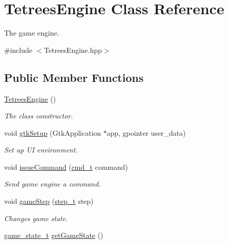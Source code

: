 \hypertarget{classTetreesEngine}{}\section{Tetrees\+Engine Class Reference}
\label{classTetreesEngine}


The game engine.  




{\ttfamily \#include $<$Tetrees\+Engine.\+hpp$>$}

\subsection*{Public Member Functions}
\begin{DoxyCompactItemize}
\item 
\mbox{\label{classTetreesEngine_ada1775237223604c895a50625eda1d49}} 
\hyperlink{classTetreesEngine_ada1775237223604c895a50625eda1d49}{Tetrees\+Engine} ()
\begin{DoxyCompactList}\small\item\em The class constructor. \end{DoxyCompactList}\item 
void \hyperlink{classTetreesEngine_a85e0da200fb3e17745f1978d24acca2f}{gtk\+Setup} (Gtk\+Application $\ast$app, gpointer user\+\_\+data)
\begin{DoxyCompactList}\small\item\em Set up UI environment. \end{DoxyCompactList}\item 
void \hyperlink{classTetreesEngine_aa2a283d09b0b6ab7c03ea2265a2e3438}{issue\+Command} (\hyperlink{TetreesDefs_8hpp_aadc337e2620d6621659e63e87c45e79d}{cmd\+\_\+t} command)
\begin{DoxyCompactList}\small\item\em Send game engine a command. \end{DoxyCompactList}\item 
void \hyperlink{classTetreesEngine_a33e9983a618b3538640b6bd987304b8b}{game\+Step} (\hyperlink{TetreesDefs_8hpp_a4d5a793092a473f85b4c1f7faf62afed}{step\+\_\+t} step)
\begin{DoxyCompactList}\small\item\em Changes game state. \end{DoxyCompactList}\item 
\hyperlink{TetreesDefs_8hpp_aebae08b2e3a36f1452b33acaf1eaab40}{game\+\_\+state\+\_\+t} \hyperlink{classTetreesEngine_a36e231a33457f87875f19d308984b0b8}{get\+Game\+State} ()

\end{DoxyCompactItemize}
